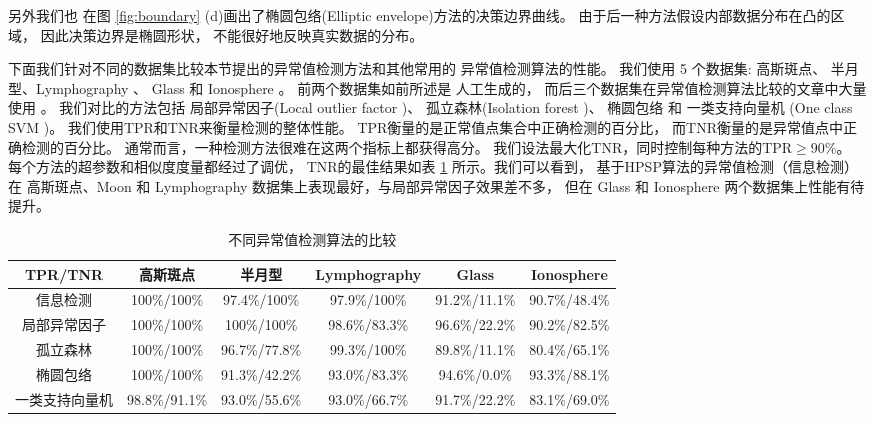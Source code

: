 另外我们也
在图 \ref{fig:boundary} (d)画出了椭圆包络\cite{rousseeuw1999fast}(Elliptic envelope)方法的决策边界曲线。
由于后一种方法假设内部数据分布在凸的区域，
因此决策边界是椭圆形状，
不能很好地反映真实数据的分布。

下面我们针对不同的数据集比较本节提出的异常值检测方法和其他常用的
异常值检测算法的性能。
我们使用 5 个数据集: 高斯斑点、 半月型、Lymphography
\cite{lazarevic2005feature}、 Glass 和 Ionosphere \cite{keller2012hics}。 
前两个数据集如前所述是
人工生成的，
而后三个数据集在异常值检测算法比较的文章中大量使用
\cite{campos2016evaluation}。
我们对比的方法包括
局部异常因子(Local outlier factor \citep{Breunig})、
孤立森林(Isolation forest \citep{if})、
椭圆包络  和
一类支持向量机 (One class SVM \citep{svm})。 
我们使用TPR和TNR来衡量检测的整体性能。
TPR衡量的是正常值点集合中正确检测的百分比，
而TNR衡量的是异常值点中正确检测的百分比。
通常而言，一种检测方法很难在这两个指标上都获得高分。
我们设法最大化TNR，同时控制每种方法的TPR$\geq 90\%$。
每个方法的超参数和相似度度量都经过了调优，
TNR的最佳结果如表 \ref{tab:odm} 所示。我们可以看到，
基于HPSP算法的异常值检测（信息检测）在 高斯斑点、Moon 和
Lymphography 数据集上表现最好，与局部异常因子效果差不多，
但在 Glass 和  Ionosphere 两个数据集上性能有待提升。
\begin{table}
  \begin{adjustbox}{width=\columnwidth,center}
\begin{tabular}{cccccc}
  \hline
         TPR/TNR        &  高斯斑点   &      半月型       &  Lymphography  &     Glass     &  Ionosphere   \\
  \hline
      信息检测    & 100\%/100\% & 97.4\%/100\%  & 97.9\%/100\% & 91.2\%/11.1\% & 90.7\%/48.4\% \\
      局部异常因子 & 100\%/100\% & 100\%/100\% & 98.6\%/83.3\%  & 96.6\%/22.2\% & 90.2\%/82.5\% \\
   孤立森林   & 100\%/100\% &  96.7\%/77.8\%  & 99.3\%/100\% & 89.8\%/11.1\% & 80.4\%/65.1\% \\
    椭圆包络   & 100\%/100\% &  91.3\%/42.2\%  & 93.0\%/83.3\%  & 94.6\%/0.0\%  & 93.3\%/88.1\% \\
     一类支持向量机     &  98.8\%/91.1\%  &  93.0\%/55.6\%  & 93.0\%/66.7\%  & 91.7\%/22.2\% & 83.1\%/69.0\% \\
  \hline
  \end{tabular}
\end{adjustbox}
\caption{不同异常值检测算法的比较}\label{tab:odm}
\end{table}


